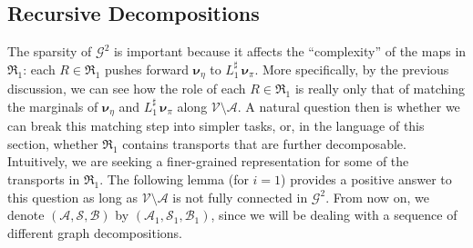 \documentclass[twoside,11pt]{article}
\newcommand{\genm}{\boldsymbol{\nu} }   %
\newcommand{\Bc}{\mathcal{B}}
\newcommand{\Vc}{\mathcal{V}}
\newcommand{\Ac}{\mathcal{A}}
\newcommand{\Sc}{\mathcal{S}}
\newcommand{\Gcb}{\boldsymbol{\mathcal{G}}}
\newcommand{\lmap}{L} %
\newcommand{\Aset}{ \Ac }
\newcommand{\Bset}{ \Bc }
\newcommand{\Sset}{ \Sc }
\newcommand{\pull}{^\sharp}
\begin{document}
\subsection{Recursive Decompositions}
\label{sec:rec_dec}
The sparsity of $\Gcb^2$ is important because 
it affects the ``complexity'' of the maps in $\mathfrak{R}_1$:
each $R \in \mathfrak{R}_1$ pushes forward 
$\genm_\eta$ to $\lmap_1\pull\,\genm_\pi$.
More specifically, by the previous discussion, we can see how
the role of each $R \in \mathfrak{R}_1$ is
really only that of matching the marginals of $\genm_\eta$ and $\lmap_1\pull\,\genm_\pi$ 
along $\Vc \setminus \Ac$.
A natural question then is whether we can break this matching step into %
simpler tasks, or, in the language of this section, whether
 $\mathfrak{R}_1$ contains transports that are
further decomposable. %
%
%
%
Intuitively, we are seeking a finer-grained representation for some of the 
transports in $\mathfrak{R}_1$.
%
%
%
%
%
%
%
%
The following lemma (for $i=1$) provides a positive answer
to this question as long as
$\Vc \setminus \Ac$
%
is not fully connected in $\Gcb^2$.
%
%
%
%
%
%
%
%
%
%
%
%
%
From now on, we denote $(\Aset ,\Sset, \Bset)$ by 
%
$(\Aset_1 ,\Sset_1, \Bset_1)$, since we will be
dealing with a sequence of different graph decompositions.
\end{document}
